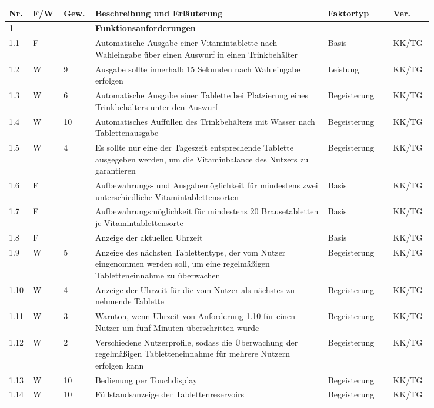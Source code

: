 \begin{longtable}{C{0.03\linewidth}C{0.05\linewidth}C{0.05\linewidth}L{0.5\linewidth}C{0.14\linewidth}C{0.07\linewidth}}
	\toprule
 	
 	\textbf{Nr.} & \textbf{F/W} & \textbf{Gew.} & \textbf{Beschreibung und Erläuterung} & \textbf{Faktortyp} & \textbf{Ver.}\\
	
	\toprule
	\endfirsthead
	
	\textbf{1} & & & \textbf{Funktionsanforderungen} && \\
	1.1 & F & & Automatische Ausgabe einer Vitamintablette nach Wahleingabe über einen Auswurf in einen Trinkbehälter & Basis & KK/TG\\
	1.2 & W & 9 & Ausgabe sollte innerhalb 15 Sekunden nach Wahleingabe erfolgen & Leistung & KK/TG\\
	1.3 & W & 6 & Automatische Ausgabe einer Tablette bei Platzierung eines Trinkbehälters unter den Auswurf&Begeisterung& KK/TG\\
	1.4 & W & 10 & Automatisches Auffüllen des Trinkbehälters mit Wasser nach Tablettenausgabe &Begeisterung& KK/TG\\
	1.5 & W & 4 & Es sollte nur eine der Tageszeit entsprechende Tablette ausgegeben werden, um die Vitaminbalance des Nutzers zu garantieren &Begeisterung& KK/TG \\
	1.6 & F & & Aufbewahrungs- und Ausgabemöglichkeit für mindestens zwei unterschiedliche Vitamintablettensorten & Basis & KK/TG\\
	1.7 & F & & Aufbewahrungsmöglichkeit für mindestens 20 Brausetabletten je Vitamintablettensorte & Basis & KK/TG\\
	1.8 & F & & Anzeige der aktuellen Uhrzeit & Basis & KK/TG\\
	1.9 & W & 5 & Anzeige des nächsten Tablettentyps, der vom Nutzer eingenommen werden soll, um eine regelmäßigen Tabletteneinnahme zu überwachen &Begeisterung& KK/TG\\
	1.10 & W & 4 & Anzeige der Uhrzeit für die vom Nutzer als nächstes zu nehmende Tablette &Begeisterung& KK/TG\\
	1.11 & W & 3 & Warnton, wenn Uhrzeit von Anforderung 1.10 für einen Nutzer um fünf Minuten überschritten wurde &Begeisterung& KK/TG\\
	1.12 & W & 2 & Verschiedene Nutzerprofile, sodass die Überwachung der regelmäßigen Tabletteneinnahme für mehrere Nutzern erfolgen kann &Begeisterung& KK/TG\\
	1.13 & W & 10 & Bedienung per Touchdisplay &Begeisterung& KK/TG\\
	1.14 & W & 10 & Füllstandsanzeige der Tablettenreservoirs &Begeisterung& KK/TG\\
	

\end{longtable}
